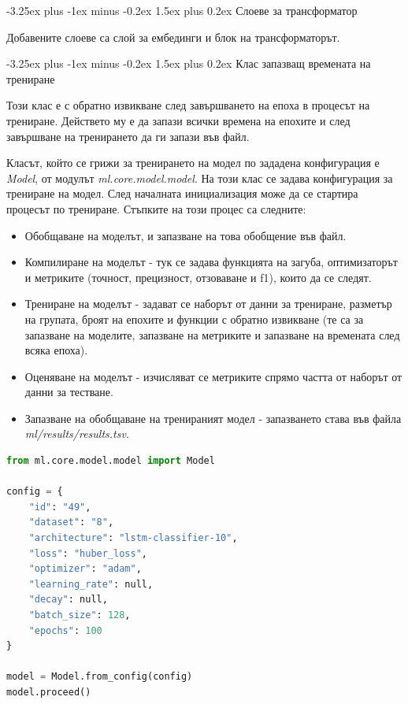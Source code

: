 \documentclass{article}
\makeatletter
\newcounter{subsubsubsection}[subsubsection]
\renewcommand\paragraph{\@startsection{paragraph}{5}{\z@}%
{3.25ex \@plus1ex \@minus.2ex}%
{-1em}%
{\normalfont\normalsize\bfseries}}
\renewcommand{\paragraph}{\@startsection{paragraph}{4}{0ex}%
{-3.25ex plus -1ex minus -0.2ex}%
{1.5ex plus 0.2ex}%
{\normalfont\normalsize\bfseries}}
\makeatother
\begin{document}
\paragraph{Слоеве за трансформатор}

Добавените слоеве са слой за ембединги и блок на трансформаторът.

\paragraph{Клас запазващ времената на трениране}

Този клас е с обратно извикване след завършването на епоха в процесът на трениране. Действето му е да запази всички
времена на епохите и след завършване на тренирането да ги запази във файл.


Класът, който се грижи за тренирането на модел по зададена конфигурация е \textit{Model}, от модулът
\textit{ml.core.model.model}. На този клас се задава конфигурация за трениране на модел. След началната инициализация
може да се стартира процесът по трениране. Стъпките на този процес са следните:

\begin{itemize}

  \item Обобщаване на моделът, и запазване на това обобщение във файл.
  \item Компилиране на моделът - тук се задава функцията на загуба, оптимизаторът и метриките (точност, прецизност,
  отзоваване и f1), които да се следят.
  \item Трениране на моделът - задават се наборът от данни за трениране, разметър на групата, броят на епохите и
  функции с обратно извикване (те са за запазване на моделите, запазване на метриките и запазване на времената след
  всяка епоха).
  \item Оценяване на моделът - изчисляват се метриките спрямо частта от наборът от данни за тестване.
  \item Запазване на обобщаване на тренираният модел - запазването става във файла \textit{ml/results/results.tsv}.

\end{itemize}

\begin{lstlisting}[language=Python, caption=Трениране на примерен модел.]
from ml.core.model.model import Model

config = {
    "id": "49",
    "dataset": "8",
    "architecture": "lstm-classifier-10",
    "loss": "huber_loss",
    "optimizer": "adam",
    "learning_rate": null,
    "decay": null,
    "batch_size": 128,
    "epochs": 100
}

model = Model.from_config(config)
model.proceed()
\end{lstlisting}
\end{document}
